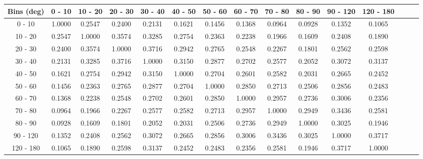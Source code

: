 \documentclass[aps, prd, reprint,showpacs,  preprintnumbers,amsmath,amssymb,superscriptaddress, nofootinbib]{revtex4-1}
\makeatletter
\renewenvironment{table}
  {\def\@captype{table}}
  {}
\makeatother
\begin{document}
\begin{table}
\centering
\begin{tabular}{ccccccccccccccc}
\hline
    Bins (deg) &       0 - 10 &      10 - 20 &      20 - 30 &      30 - 40 &      40 - 50 &      50 - 60 &      60 - 70 &      70 - 80 &      80 - 90 &     90 - 120 &    120 - 180 \\ 
\hline
   0 -  10  & 1.0000  & 0.2547  & 0.2400  & 0.2131  & 0.1621  & 0.1456  & 0.1368  & 0.0964  & 0.0928  & 0.1352  & 0.1065 \\
  10 -  20  & 0.2547  & 1.0000  & 0.3574  & 0.3285  & 0.2754  & 0.2363  & 0.2238  & 0.1966  & 0.1609  & 0.2408  & 0.1890 \\
  20 -  30  & 0.2400  & 0.3574  & 1.0000  & 0.3716  & 0.2942  & 0.2765  & 0.2548  & 0.2267  & 0.1801  & 0.2562  & 0.2598 \\
  30 -  40  & 0.2131  & 0.3285  & 0.3716  & 1.0000  & 0.3150  & 0.2877  & 0.2702  & 0.2577  & 0.2052  & 0.3072  & 0.3137 \\
  40 -  50  & 0.1621  & 0.2754  & 0.2942  & 0.3150  & 1.0000  & 0.2704  & 0.2601  & 0.2582  & 0.2031  & 0.2665  & 0.2452 \\
  50 -  60  & 0.1456  & 0.2363  & 0.2765  & 0.2877  & 0.2704  & 1.0000  & 0.2850  & 0.2713  & 0.2506  & 0.2856  & 0.2483 \\
  60 -  70  & 0.1368  & 0.2238  & 0.2548  & 0.2702  & 0.2601  & 0.2850  & 1.0000  & 0.2957  & 0.2736  & 0.3006  & 0.2356 \\
  70 -  80  & 0.0964  & 0.1966  & 0.2267  & 0.2577  & 0.2582  & 0.2713  & 0.2957  & 1.0000  & 0.2949  & 0.3436  & 0.2581 \\
  80 -  90  & 0.0928  & 0.1609  & 0.1801  & 0.2052  & 0.2031  & 0.2506  & 0.2736  & 0.2949  & 1.0000  & 0.3025  & 0.1946 \\
  90 - 120  & 0.1352  & 0.2408  & 0.2562  & 0.3072  & 0.2665  & 0.2856  & 0.3006  & 0.3436  & 0.3025  & 1.0000  & 0.3717 \\
 120 - 180  & 0.1065  & 0.1890  & 0.2598  & 0.3137  & 0.2452  & 0.2483  & 0.2356  & 0.2581  & 0.1946  & 0.3717  & 1.0000 \\
\hline
\hline
\end{tabular}
\caption{Correlation matrix for bins of $d\sigma/d\theta_\pi$.}
\label{tb:piz_theta_cov}
\end{table}

\vspace{0.5cm}
\end{document}
